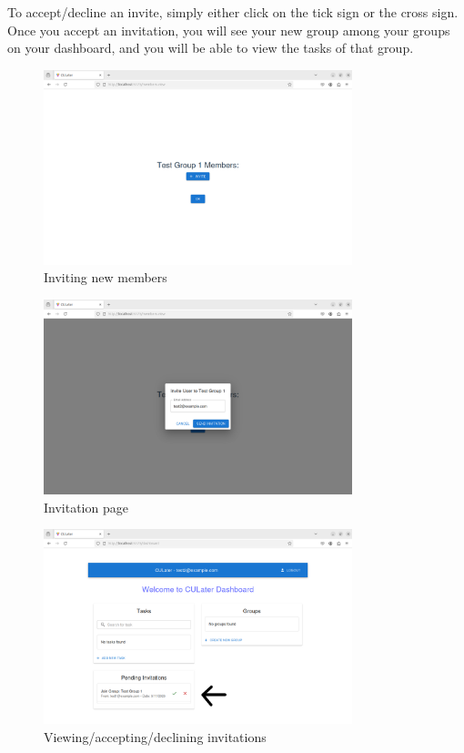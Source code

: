 \documentclass{scrreprt}
\begin{document}
To accept/decline an invite, simply either click on the tick sign or the cross sign. Once you accept an invitation, you will see your new group among your groups on your dashboard, and you will be able to view the tasks of that group.\\
\begin{figure}[htbp]
        \centering
        \includegraphics[width=0.8\textwidth]{invite_members.png}
	\caption{Inviting new members}
	\label{fig:my_label}
\end{figure}
\begin{figure}[htbp]
        \centering
        \includegraphics[width=0.8\textwidth]{invite_page.png}
	\caption{Invitation page}
	\label{fig:my_label}
\end{figure}
\begin{figure}[htbp]
        \centering
        \includegraphics[width=0.8\textwidth]{invite_sent.png}
	\caption{Viewing/accepting/declining invitations}
	\label{fig:my_label}
\end{figure}
\end{document}
